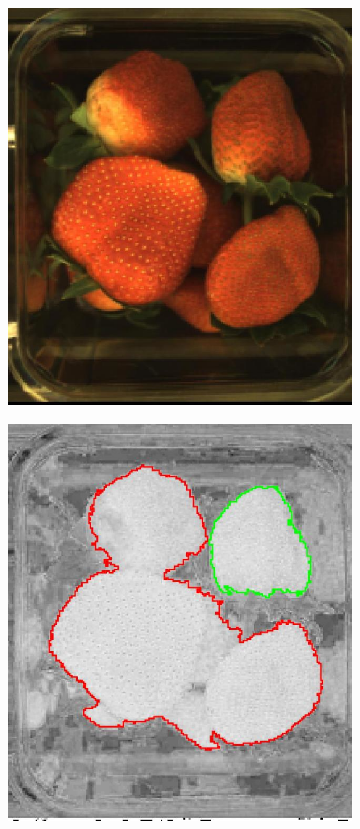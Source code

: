 \documentclass[conference]{IEEEtran}
\begin{document}
\begin{figure}[ht]
	\centering
	\begin{subfigure}{.25\textwidth}
		\centering
		\includegraphics[width=.9\linewidth]{eps/zoom_image.eps}
		\caption{}
		\label{fig:yellow_white}
	\end{subfigure}%
	\begin{subfigure}{.25\textwidth}
		\centering
		\includegraphics[width=.9\linewidth]{eps/hsv_contour.eps}
		\caption{}
		\label{fig:hsv}
	\end{subfigure}%
	

\end{figure}
\end{document}
